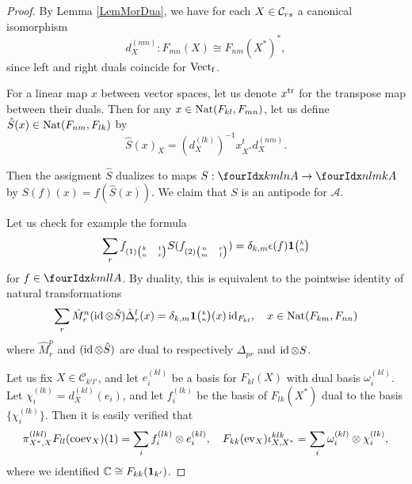\begin{proof} By Lemma \ref{LemMorDua}, we have for each $X\in \mathcal{C}_{rs}$ a canonical isomorphism \[d^{(mn)}_X:F_{mn}(X) \cong F_{nm}(X^*)^*,\] since left and right duals coincide for $\mathrm{Vect}_{\operatorname{\mathrm{f}}}$.

For a linear map $x$ between vector spaces, let us denote $x^{\operatorname{\mathrm{tr}}}$ for the transpose map between their duals. Then for any $x\in \operatorname{\mathrm{Nat}}(F_{kl},F_{mn})$, let us define $\hat{S}(x) \in \operatorname{\mathrm{Nat}}(F_{nm},F_{lk})$ by \[\hat{S}(x)_X = \left(d^{(lk)}_X\right)^{-1} x_{X^*}^t d_X^{(nm)}.\] %

Then the assigment $\hat{S}$ dualizes to maps $S:\Gr{A}{k}{l}{m}{n} \rightarrow \Gr{A}{n}{m}{l}{k}$ by $S(f)(x) = f(\hat{S}(x))$. We claim that $S$ is an antipode for $\mathscr{A}$. 

Let us check for example the formula \[\sum_r f_{(1){\tiny \begin{pmatrix}k&l\\n & r\end{pmatrix}}} S(f_{(2){\tiny \begin{pmatrix} n & r \\ m & l\end{pmatrix}}}) = \delta_{k,m}\epsilon(f)\mathbf{1}{\tiny {\begin{pmatrix} k\\n\end{pmatrix}}}\] for $f\in \Gr{A}{k}{l}{m}{l}$. By duality, this is equivalent to the pointwise identity of natural transformations \[\sum_r\hat{M}^n_r(\operatorname{id}\otimes \hat{S})\hat{\Delta}^l_r(x) = \delta_{k,m}\mathbf{1}{\tiny {\begin{pmatrix} k\\n\end{pmatrix}}}(x) \operatorname{id}_{F_{kl}},\quad x\in \operatorname{\mathrm{Nat}}(F_{km},F_{nn})\] where $\hat{M}^p_r$ and $(\operatorname{id}\otimes \hat{S})$ are dual to respectively $\Delta_{pr}$ and $\operatorname{id}\otimes S$. 

Let us fix $X\in \mathcal{C}_{k'l'}$, and let $e_i^{(kl)}$ be a basis for $F_{kl}(X)$ with dual basis $\omega_i^{(kl)}$. Let $\chi_i^{(lk)} = d_X^{(kl)}(e_i)$, and let $f_i^{(lk)}$ be the basis of $F_{lk}(X^*)$ dual to the basis $\{\chi_i^{(lk)}\}$. Then it is easily verified that \[\pi^{(lkl)}_{X^*,X}F_{ll}(\mathrm{coev}_{X})(1) = \sum_i f_i^{(lk)}\otimes e_i^{(kl)},\quad F_{kk}(\mathrm{ev}_X)\iota^{klk}_{X,X^*} = \sum_i \omega_i^{(kl)}\otimes \chi_i^{(lk)},\] where we identified $\mathbb{C}\cong F_{kk}(\mathbf{1}_{k'})$. 


\end{proof}
